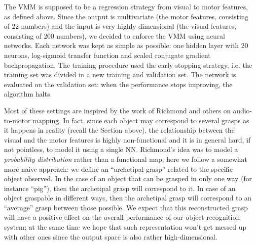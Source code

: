 The VMM is supposed to be a regression strategy from visual to motor features, 
as defined above. Since the output is multivariate
(the motor features, consisting of $22$ numbers) and the input is very highly dimensional (the visual features, consisting of $200$
numbers), we decided
to enforce the VMM using neural networks. Each network was kept as
simple as possible: one hidden layer with $20$ neurons,
log-sigmoid transfer function and scaled conjugate gradient 
backpropagation. The training procedure used the early stopping
strategy, i.e. the training set was divided in a new training
and validation set. The network is evaluated on the validation set: 
when the performance stops improving, the algorithm halts. 

Most of these settings are inspired by the work of Richmond and others
\cite{papcun,richmond2007} on audio-to-motor mapping. In fact,
since each object may correspond to several grasps as it happens in reality
(recall the Section above), the relationship between the visual  and the motor features
is highly non-functional and it is in general hard, if not pointless, to
model it using a single NN. Richmond's idea was to model a \emph{probability
distribution} rather than a functional map; here we follow a somewhat more naive approach:
we define an ``archetipal grasp'' related to the specific
object observed. In the case of an object that can be grasped in only one way 
(for instance ``pig''), then the archetipal grasp will correspond 
to it. In case of an object graspable in different ways, then the 
archetipal grasp will correspond to an ``average'' grasp between those 
possible. We expect that this reconstructed grasp will have a 
positive effect on the overall performance of our object recognition system;
at the same time we hope that such representation won't get messed up
with other ones since the output space is also rather high-dimensional.


